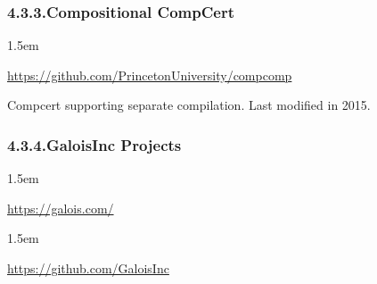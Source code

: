 \documentclass[12pt,twoside]{article}
\begin{document}
\subsubsection{4.3.3.\hspace*{0.5em}Compositional CompCert}\label{sec-compositional-compcert}%

\begin{mddefinitions}%


\begin{mdbmarginx}{}{}{}{1.5em}%
\begin{mddefdata}%
\href{https://github.com/PrincetonUniversity/compcomp}{{\ttfamily https://\hspace{0pt}github.\hspace{0pt}com/\hspace{0pt}PrincetonUniversity/\hspace{0pt}compcomp}}%
\end{mddefdata}%
\end{mdbmarginx}%
\end{mddefinitions}%

\noindent{}Compcert supporting separate compilation. Last modified in 2015.%

\subsubsection{4.3.4.\hspace*{0.5em}GaloisInc Projects}\label{sec-galoisinc-projects}%

\begin{mddefinitions}%


\begin{mdbmarginx}{}{}{}{1.5em}%
\begin{mddefdata}%
\href{https://galois.com/}{{\ttfamily https://\hspace{0pt}galois.\hspace{0pt}com/\hspace{0pt}}}
\end{mddefdata}%
\end{mdbmarginx}%


\begin{mdbmarginx}{}{}{}{1.5em}%
\begin{mddefdata}%
\href{https://github.com/GaloisInc}{{\ttfamily https://\hspace{0pt}github.\hspace{0pt}com/\hspace{0pt}GaloisInc}}%
\end{mddefdata}%
\end{mdbmarginx}%
\end{mddefinitions}%
\end{document}
